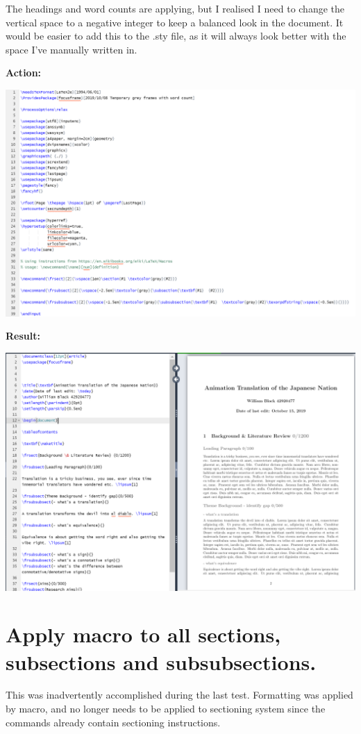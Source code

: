 \documentclass[12pt]{article}
\begin{document}
The headings and word counts are applying, but I realised I need to change the vertical space to a negative integer to keep a balanced look in the document. It would be easier to add this to the .sty file, as it will always look better with the space I've manually written in.

\newpage\textbf{Action:} 

\includegraphics[scale=0.5]{imgfrstyfile2.PNG}

\textbf{Result:} 

\includegraphics[width=\textwidth]{imgfrvspace2.PNG}

\section{\large Apply macro to all sections, subsections and subsubsections.}

This was inadvertently accomplished during the last test. Formatting was applied by macro, and no longer needs to be applied to sectioning system since the commands already contain sectioning instructions.
\end{document}
